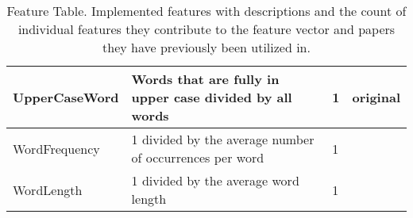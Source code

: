 \begin{table}[h]
\begin{center}
\begin{tabular}{p{2.6cm}|p{6cm}|p{1.2cm}|p{1.2cm}}
    UpperCaseWord			& Words that are fully in upper case divided by all words					& 1					& original\\ \hline
    WordFrequency			& 1 divided by the average number of occurrences per word					& 1					& \cite{madigan2005author} \cite{narayanan2012feasibility}\\ \hline
    WordLength				& 1 divided by the average word length										& 1					& \cite{argamon2003style} \cite{narayanan2012feasibility}\\
    \end{tabular}
    \end{center}
	\caption{Feature Table. Implemented features with descriptions and the count of individual features they contribute to the feature vector and papers they have previously been utilized in.}
	\label{tab:featureTable}
\end{table}
